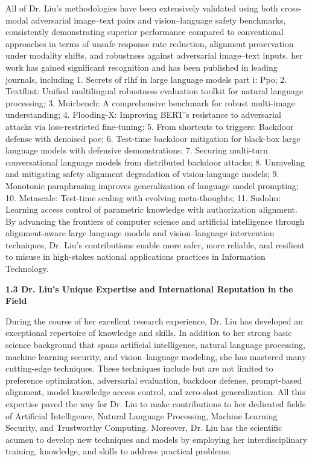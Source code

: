 \documentclass{article}
\begin{document}
All of Dr. Liu's methodologies have been extensively validated using both cross-modal adversarial image–text pairs and vision–language safety benchmarks, consistently demonstrating superior performance compared to conventional approaches in terms of unsafe response rate reduction, alignment preservation under modality shifts, and robustness against adversarial image–text inputs. her work has gained significant recognition and has been published in leading journals, including 1. Secrets of rlhf in large language models part i: Ppo; 2. Textflint: Unified multilingual robustness evaluation toolkit for natural language processing; 3. Muirbench: A comprehensive benchmark for robust multi-image understanding; 4. Flooding-X: Improving BERT’s resistance to adversarial attacks via loss-restricted fine-tuning; 5. From shortcuts to triggers: Backdoor defense with denoised poe; 6. Test-time backdoor mitigation for black-box large language models with defensive demonstrations; 7. Securing multi-turn conversational language models from distributed backdoor attacks; 8. Unraveling and mitigating safety alignment degradation of vision-language models; 9. Monotonic paraphrasing improves generalization of language model prompting; 10. Metascale: Test-time scaling with evolving meta-thoughts; 11. Sudolm: Learning access control of parametric knowledge with authorization alignment. By advancing the frontiers of computer science and artificial intelligence through alignment-aware large language models and vision–language intervention techniques, Dr. Liu's contributions enable more safer, more reliable, and resilient to misuse in high-stakes national applications practices in Information Technology.









{\bf 1.3 Dr. Liu's Unique Expertise and International Reputation in the Field }

During the course of her excellent research experience, Dr. Liu has developed an exceptional repertoire of knowledge and skills. In addition to her strong basic science background that spans artificial intelligence, natural language processing, machine learning security, and vision–language modeling, she has mastered many cutting-edge techniques. These techniques include but are not limited to preference optimization, adversarial evaluation, backdoor defense, prompt-based alignment, model knowledge access control, and zero-shot generalization. All this expertise paved the way for Dr. Liu to make contributions to her dedicated fields of Artificial Intelligence, Natural Language Processing, Machine Learning Security, and Trustworthy Computing. Moreover, Dr. Liu has the scientific acumen to develop new techniques and models by employing her interdisciplinary training, knowledge, and skills to address practical problems.
\end{document}
